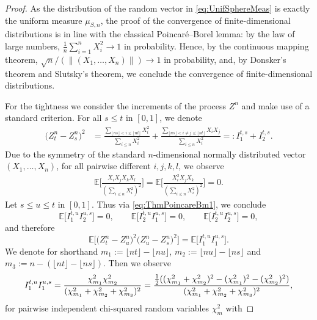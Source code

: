 \documentclass[numbers,compress,v1.0.1]{vmsta}
\theoremstyle{definition}
\def\ex{\mathbb{E}}
\begin{document}
\begin{proof}
As the distribution of the random vector in \eqref{eq:UnifSphereMeas}
is exactly the
uniform measure $\mu_{S,n}$, the proof of the convergence of
finite-dimensional distributions is in line with the classical Poincar\'
{e}--Borel lemma: by the law of large numbers, $\frac{1}{n}\sum_{i=1}^{n} X_i^2 \rightarrow1$ in probability. Hence, by the
continuous mapping theorem, $\sqrt{n}/(\|(X_1,\ldots, X_n)\|)
\rightarrow1$ in probability, and, by Donsker's theorem and Slutsky's
theorem, we conclude the convergence of finite-dimensional distributions.

For the tightness we consider the increments of the process $Z^n$ and
make use of a standard criterion. For all $s\leq t$ in $[0,1]$, we denote
%
\begin{align}
\label{eq:ThmPoincareBm0} \bigl(Z^n_t - Z^n_s
\bigr)^2 &= \frac{\sum_{ \lfloor ns \rfloor< i \leq\lfloor nt \rfloor
}X_i^2}{\sum_{i\leq n} X_i^2} + \frac{\sum_{ \lfloor ns \rfloor< i
\neq j \leq\lfloor nt \rfloor}X_iX_j}{\sum_{i\leq n} X_i^2} =:
I^{t,s}_1 + I^{t,s}_2.
\end{align}
%
Due to the symmetry of the standard $n$-dimensional normally
distributed vector\break $(X_1,\ldots, X_n)$, for all pairwise different
$i,j,k,l$, we observe
%
\begin{align}
\label{eq:ThmPoincareBm1} \ex \biggl[\frac{X_iX_jX_k X_l}{(\sum_{i\leq n} X_i^2)^2} \biggr] = \ex \biggl[
\frac{X_i^2X_jX_k}{(\sum_{i\leq n} X_i^2)^2} \biggr] =0.
\end{align}
%
Let $s \leq u \leq t$ in $[0,1]$. Thus via \eqref{eq:ThmPoincareBm1},
we conclude
%
\[
\ex \bigl[ I^{t,u}_1 I^{u,s}_2 \bigr]= 0,
\qquad \ex \bigl[ I^{t,u}_2 I^{u,s}_1\bigr] = 0,
\qquad \ex \bigl[ I^{t,u}_2 I^{u,s}_2
\bigr] = 0,
\]
%
and therefore
%
\[
\ex \bigl[ \bigl(Z^n_t - Z^n_u
\bigr)^2 \bigl(Z^n_u - Z^n_s
\bigr)^2 \bigr] = \ex \bigl[ I^{t,u}_1
I^{u,s}_1 \bigr].
\]
%
We denote for shorthand $m_1:= \lfloor nt \rfloor-\lfloor nu \rfloor$,
$m_2 := \lfloor nu \rfloor-\lfloor ns \rfloor$ and $m_3 := n-(\lfloor
nt \rfloor-\lfloor ns \rfloor)$. Then we observe
%
\[
I^{t,u}_1 I^{u,s}_1 =
\frac{\chi^2_{m_1} \chi^2_{m_2}}{ (\chi^2_{m_1} + \chi^2_{m_2} +
\chi^2_{m_3} )^2} =
\xch{\frac{\frac{1}{2} ((\chi^2_{m_1}+\chi^2_{m_2})^2 - (\chi^2_{m_1})^2 - (\chi^2_{m_2})^2 )}{ (\chi^2_{m_1} + \chi^2_{m_2} + \chi^2_{m_3} )^2},}%
{\frac{\frac{1}{2} ((\chi^2_{m_1}+\chi^2_{m_2})^2 - (\chi^2_{m_1})^2 - (\chi^2_{m_2})^2 )}{ (\chi^2_{m_1} + \chi^2_{m_2} + \chi^2_{m_3} )^2}}
\]
%
for pairwise independent chi-squared random variables $\chi^2_m$ with

\end{proof}
\end{document}
